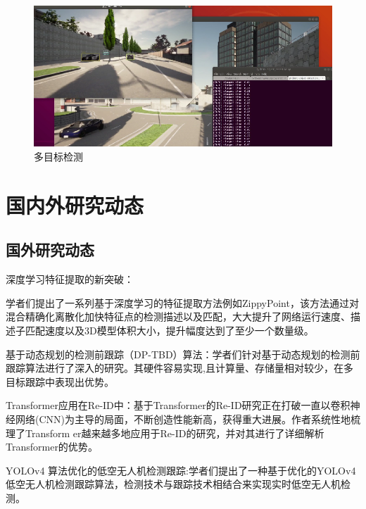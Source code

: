 \begin{figure}[htbp] %
	\centering
	\includegraphics[width=1\textwidth]{p24} %
	\caption{多目标检测} %
	\label{fig:p24} %
\end{figure}


\section{国内外研究动态}

\subsection{国外研究动态}

深度学习特征提取的新突破：

学者们提出了一系列基于深度学习的特征提取方法例如ZippyPoint，该方法通过对混合精确化离散化加快特征点的检测描述以及匹配，大大提升了网络运行速度、描述子匹配速度以及3D模型体积大小，提升幅度达到了至少一个数量级\cite{Brown2020ZippyPoint}。


基于动态规划的检测前跟踪（DP-TBD）算法：学者们针对基于动态规划的检测前跟踪算法进行了深入的研究。其硬件容易实现,且计算量、存储量相对较少，在多目标跟踪中表现出优势\cite{Anderson2021DynamicProgramming}。



Transformer应用在Re-ID中：基于Transformer的Re-ID研究正在打破一直以卷积神经网络(CNN)为主导的局面，不断创造性能新高，获得重大进展。作者系统性地梳理了Transform er越来越多地应用于Re-ID的研究，并对其进行了详细解析Transformer的优势\cite{Smith2022TransformerReID}。



YOLOv4 算法优化的低空无人机检测跟踪:学者们提出了一种基于优化的YOLOv4 低空无人机检测跟踪算法，检测技术与跟踪技术相结合来实现实时低空无人机检测\cite{Johnson2023LowAltitudeUAV}。


